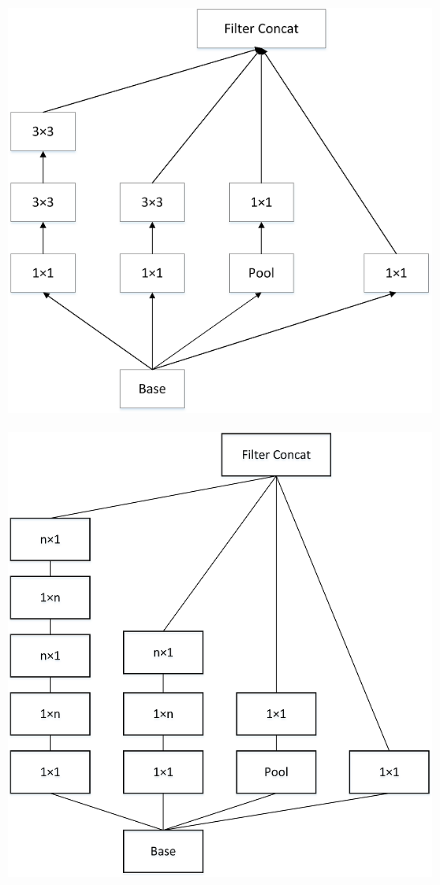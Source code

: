 \begin{figure}
\centering
\includegraphics{./img/ch4/image34.png}
\caption{}
\end{figure}

\begin{figure}
\centering
\includegraphics{./img/ch4/image36.png}
\caption{}
\end{figure}

